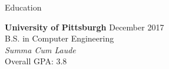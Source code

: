\documentclass{resume} %
\begin{document}

\begin{rSection}{Education}

{\bf University of Pittsburgh} \hfill {December 2017} \\
B.S. in Computer Engineering \\
\textit{Summa Cum Laude} \\
Overall GPA: 3.8

\end{rSection}

\end{document}
